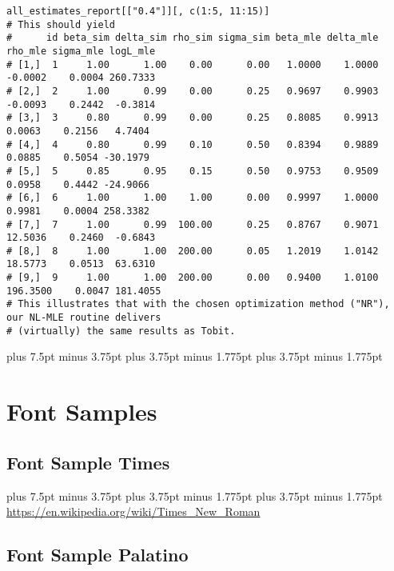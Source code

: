 \documentclass[12pt, a4paper, oneside]{article}
\newlength{\baselinedist}
\newlength{\fsnormal}
\let \normalsizeOrig \normalsize
\def\normalsize{%
		\normalsizeOrig%
		\fontsize{\fsnormal}{\baselinedist}\selectfont%
		\abovedisplayskip 13.5pt plus 6.75pt minus 3.375pt%
		\belowdisplayskip \abovedisplayskip%
		\abovedisplayshortskip 6.75pt plus 3.375pt minus 1.6875pt%
		\belowdisplayshortskip 6.75pt plus 3.375pt minus 1.6875pt%
	}
\def\normalsize{%
		\normalsizeOrig%
		\fontsize{\fsnormal}{\baselinedist}\selectfont%
		\abovedisplayskip 15pt plus 7.5pt minus 3.75pt%
		\belowdisplayskip \abovedisplayskip%
		\abovedisplayshortskip 7.5pt plus 3.75pt minus 1.775pt%
		\belowdisplayshortskip 7.5pt plus 3.75pt minus 1.775pt%
	}
\theoremstyle{Plain}
\theoremstyle{Definition}
\theoremstyle{Remark}
\begin{document}
\begin{appendix}
\begin{lstlisting}
all_estimates_report[["0.4"]][, c(1:5, 11:15)]
# This should yield
#      id beta_sim delta_sim rho_sim sigma_sim beta_mle delta_mle  rho_mle sigma_mle logL_mle
# [1,]  1     1.00      1.00    0.00      0.00   1.0000    1.0000  -0.0002    0.0004 260.7333
# [2,]  2     1.00      0.99    0.00      0.25   0.9697    0.9903  -0.0093    0.2442  -0.3814
# [3,]  3     0.80      0.99    0.00      0.25   0.8085    0.9913   0.0063    0.2156   4.7404
# [4,]  4     0.80      0.99    0.10      0.50   0.8394    0.9889   0.0885    0.5054 -30.1979
# [5,]  5     0.85      0.95    0.15      0.50   0.9753    0.9509   0.0958    0.4442 -24.9066
# [6,]  6     1.00      1.00    1.00      0.00   0.9997    1.0000   0.9981    0.0004 258.3382
# [7,]  7     1.00      0.99  100.00      0.25   0.8767    0.9071  12.5036    0.2460  -0.6843
# [8,]  8     1.00      1.00  200.00      0.05   1.2019    1.0142  18.5773    0.0513  63.6310
# [9,]  9     1.00      1.00  200.00      0.00   0.9400    1.0100 196.3500    0.0047 181.4055
# This illustrates that with the chosen optimization method ("NR"), our NL-MLE routine delivers
# (virtually) the same results as Tobit.
\end{lstlisting}

\clearpage

\begingroup

\normalsize

\section{Font Samples}

\subsection[Font Sample Times]{Font Sample Times}

\begin{otherlanguage}{ngerman}\noindent\normalsize%
	\makeatletter%
	\ifdim \f@size pt < 11.5pt%
		\fontsize{11pt}{\baselinedist}%
	\else%
		\fontsize{12pt}{\baselinedist}%
	\fi%
	\makeatother%
	\selectfont%
	\Kafka
	\medskip
	\noindent\url{https://en.wikipedia.org/wiki/Times_New_Roman} \par
\end{otherlanguage}

\subsection[Font Sample Palatino]{\selectfont Font Sample Palatino}


\end{appendix}
\end{document}

